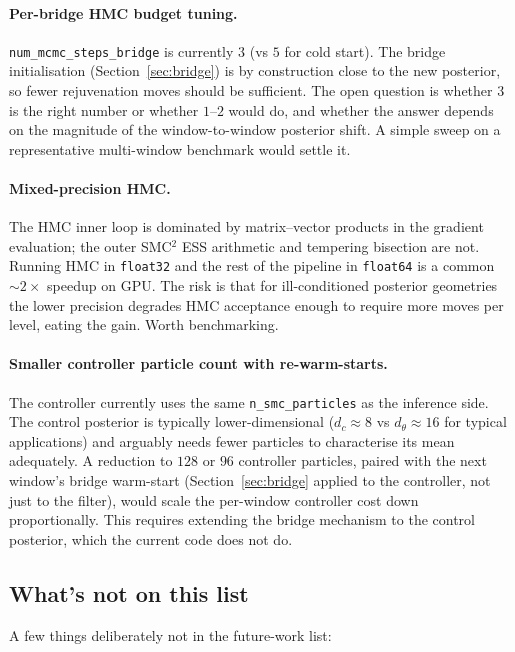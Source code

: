 \paragraph{Per-bridge HMC budget tuning.}
\texttt{num\_mcmc\_steps\_bridge} is currently $3$ (vs $5$ for cold
start). The bridge initialisation
(Section~\ref{sec:bridge}) is by construction close to the new
posterior, so fewer rejuvenation moves should be sufficient. The open
question is whether $3$ is the right number or whether $1$--$2$ would
do, and whether the answer depends on the magnitude of the
window-to-window posterior shift. A simple sweep on a representative
multi-window benchmark would settle it.

\paragraph{Mixed-precision HMC.} The HMC inner loop is dominated by
matrix--vector products in the gradient evaluation; the outer SMC$^2$
ESS arithmetic and tempering bisection are not. Running HMC in
\texttt{float32} and the rest of the pipeline in \texttt{float64} is
a common $\sim 2\times$ speedup on GPU. The risk is that for
ill-conditioned posterior geometries the lower precision degrades
HMC acceptance enough to require more moves per level, eating the
gain. Worth benchmarking.

\paragraph{Smaller controller particle count with re-warm-starts.}
The controller currently uses the same \texttt{n\_smc\_particles} as
the inference side. The control posterior is typically lower-dimensional
($d_c \approx 8$ vs $d_\theta \approx 16$ for typical applications)
and arguably needs fewer particles to characterise its mean
adequately. A reduction to $128$ or $96$ controller particles, paired
with the next window's bridge warm-start (Section~\ref{sec:bridge}
applied to the controller, not just to the filter), would scale the
per-window controller cost down proportionally. This requires
extending the bridge mechanism to the control posterior, which the
current code does not do.

\subsection{What's not on this list}

A few things deliberately not in the future-work list:

